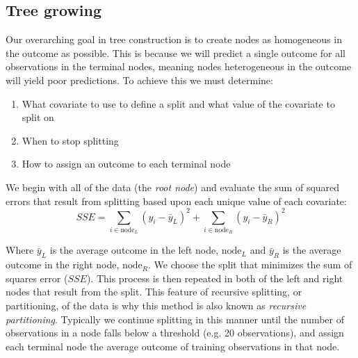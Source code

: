 \documentclass[12pt]{article}
\begin{document}

\subsection{Tree growing} %
\label{sub:tree_growing}

Our overarching goal in tree construction is to create nodes as homogeneous in the outcome as possible. This is because we will predict a single outcome for all observations in the terminal nodes, meaning nodes heterogeneous in the outcome will yield poor predictions. To achieve this we must determine:

\begin{enumerate}
  \item What covariate to use to define a split and what value of the covariate to split on
  \item When to stop splitting
  \item How to assign an outcome to each terminal node
\end{enumerate}

We begin with all of the data (the \emph{root node}) and evaluate the sum of squared errors that result from splitting based upon each unique value of each covariate:
\begin{equation}
  SSE = \sum_{i \in \text{node}_{L}} (y_{i} - \bar{y}_{L})^2 + \sum_{i \in \text{node}_{R}} (y_{i} - \bar{y}_{R})^2
\end{equation}

Where $\bar{y}_{L}$ is the average outcome in the left node, $\text{node}_{L}$ and $\bar{y}_{R}$ is the average outcome in the right node, $\text{node}_{R}$. We choose the split that minimizes the sum of squares error ($SSE$). This process is then repeated in both of the left and right nodes that result from the split. This feature of recursive splitting, or partitioning, of the data is why this method is also known as \emph{recursive partitioning}. Typically we continue splitting in this manner until the number of observations in a node falls below a threshold (e.g. 20 observations), and assign each terminal node the average outcome of training observations in that node.
\end{document}
